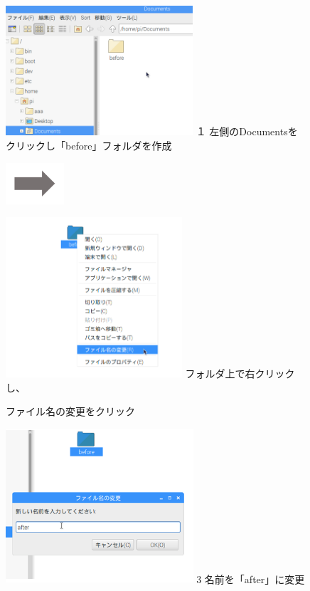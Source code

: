 \documentclass[a4paper,12pt]{jarticle}
\begin{document}
\begin{figure}[ht]
  \begin{minipage}{6.656cm}
    \includegraphics[width=6.96cm]{textbook-img058.png}
    \flushleft
    １
    左側のDocumentsをクリックし「before」フォルダを作成
  \end{minipage}
  \includegraphics[width=2.168cm]{textbook-img052.png}
  \begin{minipage}{5.751cm}
    \includegraphics[width=6.555cm]{textbook-img057.png}
     フォルダ上で右クリックし、

    ファイル名の変更をクリック
  \end{minipage}

  \begin{minipage}{6.973cm}
    \includegraphics[width=6.973cm]{textbook-img055.png}
    3 名前を「after」に変更


\end{minipage}
\end{figure}
\end{document}
